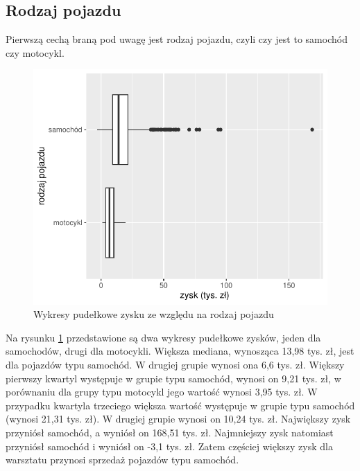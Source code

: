 \documentclass{article}\usepackage[]{graphicx}\usepackage[]{xcolor}
\makeatletter
\def\maxwidth{ %
  \ifdim\Gin@nat@width>\linewidth
    \linewidth
  \else
    \Gin@nat@width
  \fi
}
\newenvironment{knitrout}{}{} %
\makeatother
\begin{document}
\subsection{Rodzaj pojazdu}

Pierwszą cechą braną pod uwagę jest rodzaj pojazdu, czyli czy jest to samochód czy motocykl.

\begin{knitrout}
\color{fgcolor}\begin{figure}[H]

{\centering \includegraphics[width=\maxwidth]{figure/fig_typ-1} 

}

\caption[Wykresy pudełkowe zysku ze względu na rodzaj pojazdu]{Wykresy pudełkowe zysku ze względu na rodzaj pojazdu}\label{fig:fig_typ}
\end{figure}

\end{knitrout}

Na rysunku \ref{fig:fig_typ} przedstawione są dwa wykresy pudełkowe zysków, jeden dla samochodów, drugi dla motocykli. Większa mediana, wynosząca 13,98 tys. zł, jest dla pojazdów typu samochód. W drugiej grupie wynosi ona 6,6 tys. zł. 
Większy pierwszy kwartyl występuje w grupie typu samochód, wynosi on 9,21 tys. zł, w porównaniu dla grupy typu motocykl jego wartość wynosi 3,95 tys. zł.
W przypadku kwartyla trzeciego większa wartość występuje w grupie typu samochód (wynosi 21,31 tys. zł). W drugiej grupie wynosi on 10,24 tys. zł.
Największy zysk przyniósł samochód, a wyniósł on 168,51 tys. zł. 
Najmniejszy zysk natomiast przyniósł samochód i wyniósł on -3,1 tys. zł. Zatem częściej większy zysk dla warsztatu przynosi sprzedaż pojazdów typu samochód. 
\end{document}
